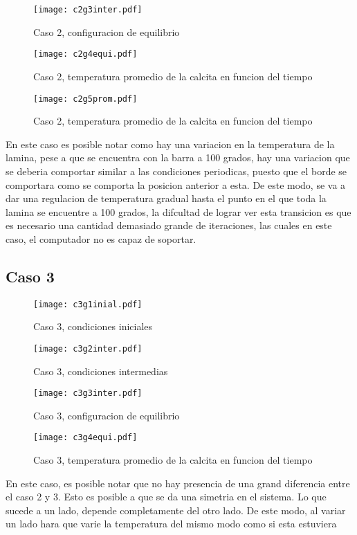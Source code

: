 \documentclass[reprint,amsmath,amssymb]{revtex4-1}
\begin{document}
\begin{figure}[h!]
    \centering
    \texttt{[image: c2g3inter.pdf]}
    \caption{Caso 2, configuracion de equilibrio}
\end{figure}

\begin{figure}[h!]
    \centering
    \texttt{[image: c2g4equi.pdf]}
    \caption{Caso 2, temperatura promedio de la calcita en funcion del tiempo}
\end{figure}

\begin{figure}[h!]
    \centering
    \texttt{[image: c2g5prom.pdf]}
    \caption{Caso 2, temperatura promedio de la calcita en funcion del tiempo}
\end{figure}
En este caso es posible notar como hay una variacion en la temperatura de la lamina, pese a que se encuentra con la barra a 100 grados, hay una variacion que se deberia comportar similar a las condiciones periodicas, puesto que el borde se comportara como se comporta la posicion anterior a esta. De este modo, se va a dar una regulacion de temperatura gradual hasta el punto en el que toda la lamina se encuentre a 100 grados, la difcultad de lograr ver esta transicion es que es necesario una cantidad demasiado grande de iteraciones, las cuales en este caso, el computador no es capaz de soportar.
\subsection{Caso 3}

\begin{figure}[h!]
    \centering
    \texttt{[image: c3g1inial.pdf]}
    \caption{Caso 3, condiciones iniciales}
\end{figure}

\begin{figure}[h!]
    \centering
    \texttt{[image: c3g2inter.pdf]}
    \caption{Caso 3, condiciones intermedias}
\end{figure}

\begin{figure}[h!]
    \centering
    \texttt{[image: c3g3inter.pdf]}
    \caption{Caso 3, configuracion de equilibrio}
\end{figure}

\begin{figure}[h!]
    \centering
    \texttt{[image: c3g4equi.pdf]}
    \caption{Caso 3, temperatura promedio de la calcita en funcion del tiempo}
\end{figure}

En este caso, es posible notar que no hay presencia de una grand diferencia entre el caso 2 y 3. Esto es posible a que se da una simetria en el sistema. Lo que sucede a un lado, depende completamente del otro lado. De este modo, al variar un lado  hara que varie la temperatura del mismo modo como si esta estuviera 
\end{document}
